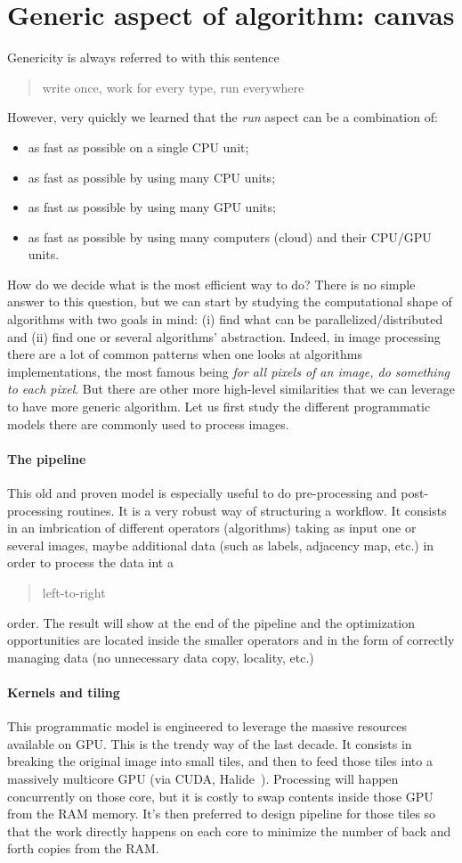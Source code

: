 \section{Generic aspect of algorithm: canvas}
\label{sec:canvas}

Genericity is always referred to with this sentence \blockquote{write once, work for every type, run everywhere}.
However, very quickly we learned that the \emph{run} aspect can be a combination of:
\begin{itemize}
  \item as fast as possible on a single CPU unit;
  \item as fast as possible by using many CPU units;
  \item as fast as possible by using many GPU units;
  \item as fast as possible by using many computers (cloud) and their CPU/GPU units.
\end{itemize}
How do we decide what is the most efficient way to do? There is no simple answer to this question, but we can start by
studying the computational shape of algorithms with two goals in mind: (i) find what can be parallelized/distributed and
(ii) find one or several algorithms' abstraction. Indeed, in image processing there are a lot of common patterns when
one looks at algorithms implementations, the most famous being \emph{for all pixels of an image, do something to each
  pixel}. But there are other more high-level similarities that we can leverage to have more generic algorithm. Let us
first study the different programmatic models there are commonly used to process images.

\paragraph{The pipeline} This old and proven model is especially useful to do pre-processing and post-processing
routines. It is a very robust way of structuring a workflow. It consists in an imbrication of different operators
(algorithms) taking as input one or several images, maybe additional data (such as labels, adjacency map, etc.) in order
to process the data int a \blockquote{left-to-right} order. The result will show at the end of the pipeline and the
optimization opportunities are located inside the smaller operators and in the form of correctly managing data (no
unnecessary data copy, locality, etc.)

\paragraph{Kernels and tiling} This programmatic model is engineered to leverage the massive resources available on GPU.
This is the trendy way of the last decade. It consists in breaking the original image into small tiles, and then to feed
those tiles into a massively multicore GPU (via CUDA, Halide~\parencite{ragankelley.2013.halide}). Processing will
happen concurrently on those core, but it is costly to swap contents inside those GPU from the RAM memory. It's then
preferred to design pipeline for those tiles so that the work directly happens on each core to minimize the number of
back and forth copies from the RAM.

